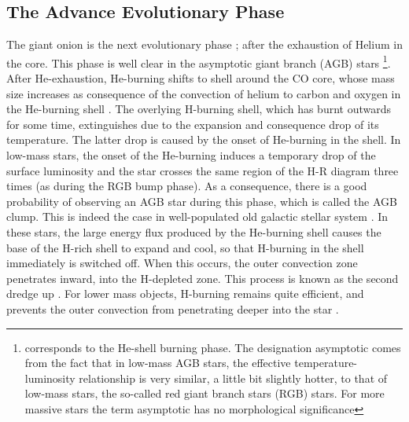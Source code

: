 \subsection{The Advance Evolutionary Phase}
The giant onion is the next evolutionary phase ; after the exhaustion of Helium in the core. This phase is well clear in the asymptotic giant branch (AGB) stars \footnote{corresponds to the He-shell burning phase. The designation asymptotic comes from the fact that in low-mass AGB stars, the effective temperature-luminosity relationship is very similar, a little bit slightly hotter, to that of low-mass stars, the so-called red giant branch stars (RGB) stars. For more massive stars the term asymptotic has no morphological significance}. After He-exhaustion, He-burning shifts to shell around the CO core, whose mass size increases as consequence of the convection of helium to carbon and oxygen in the He-burning shell \citep{1962AJ.....67Q.577H, 1962ApJ...136..166H, 1968PThPh..39.1432S,1976ApJ...207..209L,1970PThPh..44..599S,1997ApJ...489..772I,2006A&A...448..717S}. The overlying H-burning shell, which has burnt outwards for some time, extinguishes due to the expansion and consequence drop of its temperature. The latter drop is caused by the onset of He-burning in the shell. In low-mass stars, the onset of the He-burning induces a temporary drop of the surface luminosity and the star crosses the same region of the H-R diagram three times (as during the RGB bump phase). As a consequence, there is a good probability of observing an AGB star during this phase, which is called the AGB clump. This is indeed the case in well-populated old galactic stellar system \citep{1991ApJS...76..911C,2001MmSAI..72..703D}. In these stars, the large energy flux produced by the He-burning shell causes the base of the H-rich shell to expand and cool, so that H-burning in the shell immediately is switched off. When this occurs, the outer convection zone penetrates inward, into the H-depleted zone. This process is known as the second dredge up \citep{1979ApJ...232..831B}. For lower mass objects, H-burning remains quite efficient, and prevents the outer convection from penetrating deeper into the star \citep[therefore the second dredge up dose not occur,][]{1979ApJ...232..831B}.



